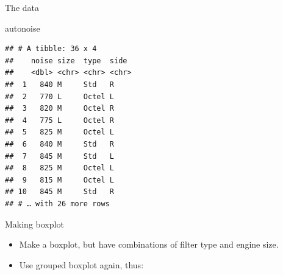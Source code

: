 \documentclass[ignorenonframetext,]{beamer}
\newenvironment{Shaded}{\begin{snugshade}}{\end{snugshade}}
\newcommand{\DataTypeTok}[1]{\textcolor[rgb]{0.13,0.29,0.53}{#1}}
\newcommand{\KeywordTok}[1]{\textcolor[rgb]{0.13,0.29,0.53}{\textbf{#1}}}
\newcommand{\NormalTok}[1]{#1}
\newcommand{\OperatorTok}[1]{\textcolor[rgb]{0.81,0.36,0.00}{\textbf{#1}}}
\newcommand{\StringTok}[1]{\textcolor[rgb]{0.31,0.60,0.02}{#1}}
\begin{document}
\begin{frame}[fragile]{The data}
\protect\hypertarget{the-data-8}{}

\begin{Shaded}
\begin{Highlighting}[]
\NormalTok{autonoise}
\end{Highlighting}
\end{Shaded}

\begin{verbatim}
## # A tibble: 36 x 4
##    noise size  type  side 
##    <dbl> <chr> <chr> <chr>
##  1   840 M     Std   R    
##  2   770 L     Octel L    
##  3   820 M     Octel R    
##  4   775 L     Octel R    
##  5   825 M     Octel L    
##  6   840 M     Std   R    
##  7   845 M     Std   L    
##  8   825 M     Octel L    
##  9   815 M     Octel L    
## 10   845 M     Std   R    
## # … with 26 more rows
\end{verbatim}

\end{frame}

\begin{frame}[fragile]{Making boxplot}
\protect\hypertarget{making-boxplot}{}

\begin{itemize}
\item
  Make a boxplot, but have combinations of filter type and engine size.
\item
  Use grouped boxplot again, thus:
\end{itemize}

\begin{Shaded}
\end{Shaded}

\end{frame}
\end{document}
